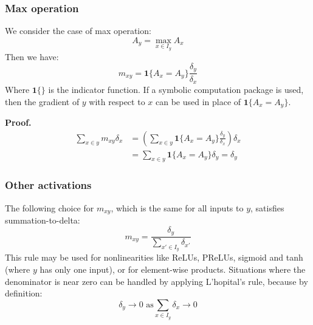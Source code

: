 \documentclass{article}
\begin{document}

\subsubsection{Max operation}

We consider the case of max operation:
\begin{equation}
A_y = \max_{x \in I_y} A_x
\end{equation}
Then we have:
\begin{equation}
m_{xy} = \bm{1}\{A_x = A_y\}\frac{\delta_y}{\delta_x}
\end{equation}
Where $\bm{1}\{\}$ is the indicator function. If a symbolic computation package is used, then the gradient of $y$ with respect to $x$ can be used in place of $\bm{1}\{A_x = A_y\}$.

{\bf Proof.}
\begin{equation}
\begin{aligned}
\sum_{x \in y} m_{xy} \delta_x &= \left(\sum_{x \in y} \bm{1}\{A_x = A_y\}\frac{\delta_y}{\delta_x}\right)\delta_x\\ &= \sum_{x \in y} \bm{1}\{A_x = A_y\}\delta_y = \delta_y
\end{aligned}
\end{equation}


\subsubsection{Other activations}
The following choice for $m_{xy}$, which is the same for all inputs to $y$, satisfies summation-to-delta:\\
\begin{equation}
m_{xy} = \frac{\delta_{y}}{\sum_{x' \in I_y} \delta_{x'}}
\end{equation}
This rule may be used for nonlinearities like ReLUs, PReLUs, sigmoid and tanh (where $y$ has only one input), or for element-wise products. Situations where the denominator is near zero can be handled by applying L'hopital's rule, because by definition:
\begin{equation}
\delta_{y} \rightarrow 0 \text{ as} \sum_{x \in I_y} \delta_{x} \rightarrow 0
\end{equation}
\end{document}
